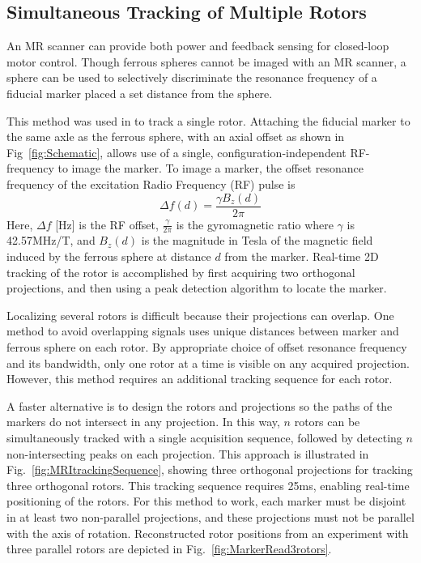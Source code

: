 \subsection{Simultaneous Tracking of Multiple Rotors}\label{subsec:FeedbackSensing}
An MR scanner can provide both power and feedback sensing for closed-loop motor control. Though ferrous spheres cannot be imaged with an MR scanner, a sphere can be used to selectively discriminate the resonance frequency of a fiducial marker placed a set distance from the sphere.

This method was used in \cite{vartholomeos2013mri} to track a single rotor.  Attaching the fiducial marker to the same axle as the ferrous sphere, with an axial offset as shown in Fig~\ref{fig:Schematic}, allows use of a single, configuration-independent RF-frequency to image the marker.
To image a marker, the offset resonance frequency of the excitation Radio Frequency (RF) pulse is
\begin{equation}
\Delta f(d) = \frac{\gamma B_z(d)}{2\pi}
\label{eq:resonanceFreq}
\end{equation}
Here, $\Delta f$ [Hz] is the RF offset, $\frac{\gamma}{2\pi}$ is the gyromagnetic ratio where $\gamma$ is 42.57MHz/T, and $B_z(d)$ is the magnitude in Tesla of the magnetic field induced by the ferrous sphere at distance $d$ from the marker.
Real-time 2D tracking of the rotor is accomplished by first acquiring two orthogonal projections, and then using a peak detection algorithm to locate the marker.

Localizing several rotors is difficult because their projections can overlap.  One method to avoid overlapping signals uses unique distances between marker and ferrous sphere on each rotor. 
 By appropriate choice of offset resonance frequency and its bandwidth, only one rotor at a time is visible on any acquired projection. However, this method requires an additional tracking sequence for each rotor.   

A faster alternative is to design the rotors and projections so the paths of the markers do not intersect in any projection. In this way, $n$ rotors can be simultaneously tracked with a single acquisition sequence, followed by detecting $n$ non-intersecting peaks on each projection. This approach is illustrated in Fig.~\ref{fig:MRItrackingSequence}, showing three orthogonal projections for tracking three orthogonal rotors.  This tracking sequence requires 25ms, enabling real-time positioning of the rotors.
For this method to work, each marker must be disjoint in at least two non-parallel projections, and these projections must not be parallel with the axis of rotation. Reconstructed rotor positions from an experiment with three parallel rotors are depicted in Fig.~\ref{fig:MarkerRead3rotors}. 


